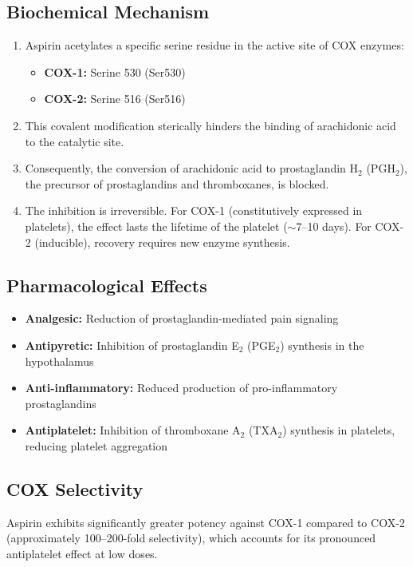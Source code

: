 \documentclass[11pt, a4paper]{article}
\begin{document}
\subsection{Biochemical Mechanism}
\begin{enumerate}
    \item Aspirin acetylates a specific serine residue in the active site of COX enzymes:
    \begin{itemize}
        \item \textbf{COX-1:} Serine 530 (Ser530)
        \item \textbf{COX-2:} Serine 516 (Ser516)
    \end{itemize}
    \item This covalent modification sterically hinders the binding of arachidonic acid to the catalytic site.
    \item Consequently, the conversion of arachidonic acid to prostaglandin H$_2$ (PGH$_2$), the precursor of prostaglandins and thromboxanes, is blocked.
    \item The inhibition is irreversible. For COX-1 (constitutively expressed in platelets), the effect lasts the lifetime of the platelet ($\sim$7--10 days). For COX-2 (inducible), recovery requires new enzyme synthesis.
\end{enumerate}

\subsection{Pharmacological Effects}
\begin{itemize}
    \item \textbf{Analgesic:} Reduction of prostaglandin-mediated pain signaling
    \item \textbf{Antipyretic:} Inhibition of prostaglandin E$_2$ (PGE$_2$) synthesis in the hypothalamus
    \item \textbf{Anti-inflammatory:} Reduced production of pro-inflammatory prostaglandins
    \item \textbf{Antiplatelet:} Inhibition of thromboxane A$_2$ (TXA$_2$) synthesis in platelets, reducing platelet aggregation
\end{itemize}

\subsection{COX Selectivity}
Aspirin exhibits significantly greater potency against COX-1 compared to COX-2 (approximately 100--200-fold selectivity), which accounts for its pronounced antiplatelet effect at low doses.
\end{document}
